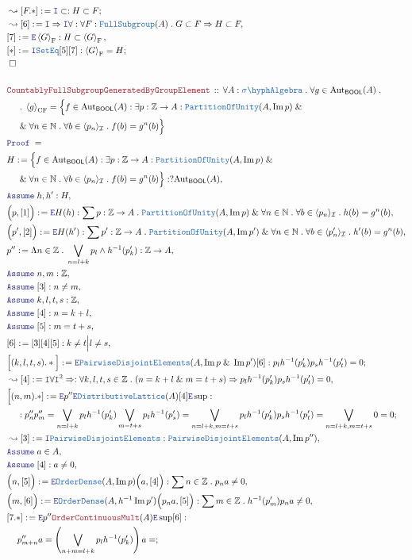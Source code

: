 \documentclass[12pt]{scrartcl}
\newcommand{\TYPE}[1]{\textcolor{NavyBlue}{\mathtt{#1}}}
\newcommand{\LOGIC}[1]{\textcolor{Blue}{\mathtt{#1}}}
\newcommand{\THM}[1]{\textcolor{Maroon}{\mathtt{#1}}}
\renewcommand{\.}{\; . \;}
\newcommand{\de}{: \kern 0.1pc =}
\newcommand{\Theorem}[2]{& \THM{#1} \, :: \, #2 \\ & \Proof = \\ }
\newcommand{\NewLine}{\\ & \kern 1pc}
\newcommand{\Page}[1]{ \begin{align*} #1 \end{align*}   }
\renewcommand{\And}{\; \& \;}
\newcommand{\Imply}{\Rightarrow}
\newcommand{\Intro}{\LOGIC{I}}
\newcommand{\Elim}{\LOGIC{E}}
\newcommand{\Int}{\mathbb{Z} }
\newcommand{\Nat}{\mathbb{N} }
\DeclareMathOperator*{\im}{Im}
\newcommand{\Aut}{\mathrm{Aut}}
\newcommand{\Say}[3]{& #1 \de #2 : #3, \\}
\newcommand{\Conclude}[3]{& #1 \de #2 : #3; \\}
\newcommand{\Derive}[3]{& \leadsto #1 \de #2 : #3, \\}
\newcommand{\DeriveConclude}[3]{& \leadsto #1 \de #2 : #3 ; \\}
\newcommand{\Assume}[2]{& \LOGIC{Assume} \; #1 : #2, \\}
\newcommand{\AssumeIn}[2]{& \LOGIC{Assume} \; #1 \in #2, \\}
\newcommand{\QED}{\; \square}
\newcommand{\EndProof}{& \QED \\}
\newcommand{\Proof}{\LOGIC{Proof} \; }
\newcommand{\SA}{\TYPE{\sigma \hyph Algebra}}
\newcommand{\I}{\mathcal{I}}
\newcommand{\PD}{\TYPE{PairwiseDisjointElements}}
\newcommand{\PoU}{\TYPE{PartitionOfUnity}}
\newcommand{\OD}{\TYPE{OrderDense}}
\newcommand{\FS}{\TYPE{FullSubgroup}}
\newcommand{\genFS}[1]{\left\langle #1 \right\rangle_\mathrm{F}}
\newcommand{\genCFS}[1]{\left\langle #1 \right\rangle_\mathrm{CF}}
\newcommand{\BOOL}{\mathsf{BOOL}}
\begin{document}
\Page{
	\DeriveConclude{[F.*]}{\Intro \subset}{H \subset F}
	\Derive{[6]}{\Intro \Imply \Intro \forall }
	{
		\forall F : \FS(A) \. G \subset F \Imply H \subset F
	}
	\Say{[7]}{\Elim \genFS{G}}
	{
		H \subset \genFS{G}
	}
	\Conclude{[*]}{\Intro \TYPE{SetEq}[5][7]}{\genFS{G} = H}
	\EndProof
	\\
	\Theorem{CountablyFullSubgroupGeneratedByGroupElement}
	{
		\forall A : \SA \.
		\forall g \in \Aut_\BOOL(A) \.
		\NewLine \.
		\genCFS{g } =
		\Big\{
			f \in  \Aut_\BOOL(A) :
			\exists p : \Int \to A : \PoU(A,\im p) 
			\And \NewLine \And
			\forall n \in \Nat \. 
			\forall b \in \langle p_n \rangle_\I  \.
			f(b) =  g^n(b)  
		\Big\}	
	}
	\Say{H}
	{
		\Big\{
			f \in  \Aut_\BOOL(A) :
			\exists p : \Int \to A : \PoU(A,\im p) 
			\And \NewLine \And
			\forall n \in \Nat \. 
			\forall b \in \langle p_n \rangle_\I  \.
			f(b) =  g^n(b)  
		\Big\}	
	}{ ? \Aut_\BOOL(A)}
	\Assume{h,h'}{H}
	\Say{\Big(p,[1]\Big)}{\Elim H(h)}
	{
		\sum p : \Int \to A \.
		\PoU(A,\im p) 
		\And
		\forall n \in \Nat \.
		\forall b \in \langle p_n \rangle_\I \.
		h(b) = g^n(b)
	}
	\Say{\Big(p',[2]\Big)}{\Elim H(h')}
	{
		\sum p' : \Int \to A \.
		\PoU(A,\im p') 
		\And
		\forall n \in \Nat \.
		\forall b \in \langle p_n' \rangle_\I \.
		h'(b) = g^n(b)
	}
	\Say{p''}{\Lambda n \in \Int \. \bigvee_{n = l + k} p_l \wedge h^{-1}(p_k')}
	{
		\Int \to A
	}
	\Assume{n,m}{\Int}
	\Assume{[3]}{n \neq m}
	\Assume{k,l,t,s}{\Int}
	\Assume{[4]}{n = k + l}
	\Assume{[5]}{m = t + s}
	\Say{[6]}{[3][4][5]}{k \neq t \Big| l \neq s }
	\Conclude{\Big[(k,l,t,s).*\Big]}
	{
		\Elim \PD(A,\im p \And \im p')[6]	
	}{
		p_l h^{-1}(p'_k) p_s h^{-1}(p'_t) = 0
	}
	\Derive{[4]}{\Intro \forall \Intro^2 \Imply}
	{
		\forall k,l,t,s \in \Int \. 
		(n = k + l \And m=t + s)
		\Imply 
		p_l  h^{-1}(p'_k) p_s h^{-1}(p'_t) = 0 	
	}
	\Conclude{\Big[(n,m).*]}
	{
		\Elim p''
		\Elim \TYPE{DistributiveLattice}(A)
		[4]
		\Elim \sup
	}
	{
		\NewLine :		
		p''_n p''_m  =
		\bigvee_{n = l + k} p_l h^{-1}(p_k') \bigvee_{m = t + s} p_t h^{-1}(p_s')= 
		\bigvee_{n=l+k,m=t + s} p_l h^{-1}(p'_k)  p_s h^{-1}(p'_t) =
		\bigvee_{n=l+k,m=t + s} 0 =
		0
	}
	\Derive{[3]}{\Intro \PD}{\PD(A,\im p'')}
	\AssumeIn{a}{A}
	\Assume{[4]}{a \neq 0}
	\Say{\Big(n,[5]\Big)}{\Elim \OD(A,\im p)\Big(a,[4]\Big)}
	{
		\sum n \in \Int \. p_n a \neq 0
	}
	\Say{\Big(m,[6]\Big)}{\Elim \OD(A,h^{-1}\im p')\Big(p_n a,[5]\Big)}
	{
		\sum m \in \Int \. h^{-1}(p_m') p_n a \neq 0
	}
	\Conclude{[7.*]}{
		\Elim p''
		\THM{OrderContinuousMult}(A)
		\Elim \sup
		[6]	
	}
	{
		\NewLine		
		p_{m + n}''a =
		\left(\bigvee_{n + m = l + k} p_l h^{-1}(p_k')\right)a =
}}
\end{document}
